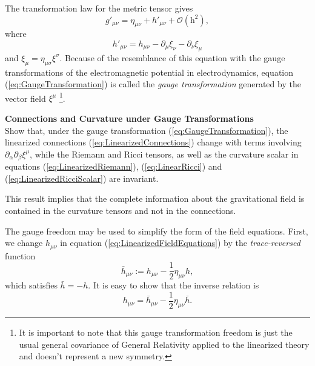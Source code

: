 The transformation law for the metric tensor gives
\begin{equation}
g'_{\mu \nu} = \eta_{\mu \nu} + h'_{\mu \nu} + \mathcal{O} ( \textrm{h}^2 ), 
\end{equation}
where
\begin{equation}
h'_{\mu \nu} =  h_{\mu \nu} -\partial_\mu \xi_\nu - \partial_\nu \xi_\mu  \label{eq:GaugeTransformation}
\end{equation}
and $\xi_\mu = \eta_{\mu \sigma} \xi^\sigma$. Because of the resemblance of this equation with the gauge transformations of the electromagnetic potential in electrodynamics, equation (\ref{eq:GaugeTransformation}) is called the \textit{gauge transformation} generated by the vector field $\xi^\mu$ \footnote{It is important to note that this gauge transformation freedom is just the usual general covariance of General Relativity applied to the linearized theory and doesn't represent a new symmetry.}.

\begin{exercise}
\textbf{Connections and Curvature under Gauge Transformations}\\

Show that, under the gauge transformation (\ref{eq:GaugeTransformation}), the linearized connections (\ref{eq:LinearizedConnections}) change with terms involving $\partial_\alpha \partial_\beta \xi^\mu$, while the Riemann and Ricci tensors, as well as the curvature scalar in equations (\ref{eq:LinearizedRiemann}), (\ref{eq:LinearRicci}) and (\ref{eq:LinearizedRicciScalar}) are invariant. 

This result implies that the complete information about the gravitational field is contained in the curvature tensors and not in the connections.
\end{exercise}

The gauge freedom may be used to simplify the form of the field equations. First, we change $h_{\mu \nu}$ in equation (\ref{eq:LinearizedFieldEquations}) by the \textit{trace-reversed} function
\begin{equation}
\bar{h}_{\mu \nu} := h_{\mu \nu} - \frac{1}{2} \eta_{\mu \nu} h,
\end{equation}
which satisfies $\bar{h} = -h$. It is easy to show that the inverse relation is 
\begin{equation}
h_{\mu \nu} = \bar{h}_{\mu \nu} - \frac{1}{2} \eta_{\mu \nu} \bar{h}. \label{eq:TracedInverse02}
\end{equation} 


